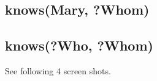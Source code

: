 \documentclass[letterpaper,10pt,english]{sphinxmanual}
\begin{document}
\subsection{knows(Mary, ?Whom)}
\label{assign3:knows-mary-whom}\begin{figure}[htbp]
\centering

\end{figure}


\subsection{knows(?Who, ?Whom)}
\label{assign3:knows-who-whom}
See following 4 screen shots.
\begin{figure}[htbp]
\centering

\end{figure}
\end{document}
